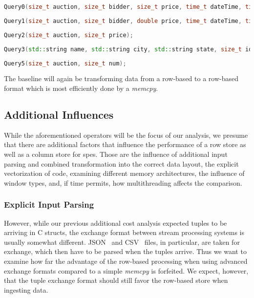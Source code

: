 \begin{lstlisting}[language=c++]
Query0(size_t auction, size_t bidder, size_t price, time_t dateTime, time_t expires, std::string extra);
\end{lstlisting}

\begin{lstlisting}[language=c++]
Query1(size_t auction, size_t bidder, double price, time_t dateTime, time_t expires, std::string extra);
\end{lstlisting}

\begin{lstlisting}[language=c++]
Query2(size_t auction, size_t price);
\end{lstlisting}
    
\begin{lstlisting}[language=c++]
Query3(std::string name, std::string city, std::string state, size_t id);
\end{lstlisting}

\begin{lstlisting}[language=c++]
Query5(size_t auction, size_t num);
\end{lstlisting}

The baseline will again be transforming data from a row-based to a row-based format which is most efficiently done by a \emph{memcpy}.

\subsection{Additional Influences}

While the aforementioned operators will be the focus of our analysis, we presume that there are additional factors that influence the performance of a row store as well as a column store for \acp{spe}.
Those are the influence of additional input parsing and combined transformation into the correct data layout, the explicit vectorization of code, examining different memory architectures, the influence of window types, and, if time permits, how multithreading affects the comparison.

\subsubsection{Explicit Input Parsing}
However, while our previous additional cost analysis expected tuples to be arriving in C structs, the exchange format between stream processing systems is usually somewhat different.
JSON~\cite{DBLP:journals/pvldb/PalkarABZ18,DBLP:journals/vldb/LangdaleL19,DBLP:journals/pvldb/LiKCGK17} and CSV~\cite{DBLP:journals/pvldb/MuhlbauerRSRK013,DBLP:conf/sigmod/0002LECK19,DBLP:journals/pvldb/StehleJ20} files, in particular, are taken for exchange, which then have to be parsed when the tuples arrive.
Thus we want to examine how far the advantage of the row-based processing when using advanced exchange formats compared to a simple \emph{memcpy} is forfeited.
We expect, however, that the tuple exchange format should still favor the row-based store when ingesting data.

